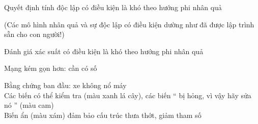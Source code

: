 \documentclass{article}
\begin{document}
\begin{huge}


\vspace*{0.1in}

\textwidth
{}

\vspace*{-0.65in}

\\
\\
\\
\\
\\



\vspace*{0.15in}

\textwidth
{}

\vspace*{-0.15in}

Quyết định tính độc lập có điều kiện là khó theo hướng phi nhân quả

(Các mô hình nhân quả và sự độc lập có điều kiện dường như đã được lập trình sẵn cho con người!)

Đánh giá xác suất có điều kiện là khó theo hướng phi nhân quả

Mạng kém gọn hơn: cần có số 




Bằng chứng ban đầu: xe không nổ máy\\
Các biến có thể kiểm tra (màu xanh lá cây), các biến `` bị hỏng, vì vậy hãy sửa nó '' (màu cam) \\
Biến ẩn (màu xám) đảm bảo cấu trúc thưa thớt, giảm tham số


\end{huge}
\end{document}
